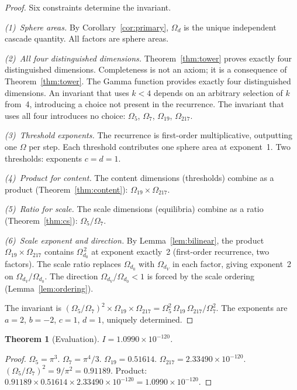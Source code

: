 \documentclass[11pt,a4paper]{article}
\newtheorem{theorem}{Theorem}[section]
\begin{document}
\begin{proof}
Six constraints determine the invariant.

\emph{(1)~Sphere areas.} By Corollary~\ref{cor:primary}, $\Omega_d$ is the
unique independent cascade quantity. All factors are sphere areas.

\emph{(2)~All four distinguished dimensions.}
Theorem~\ref{thm:tower} proves exactly four distinguished dimensions.
Completeness is not an axiom; it is a consequence of Theorem~\ref{thm:tower}.
The Gamma function provides exactly four distinguished dimensions. An
invariant that uses $k < 4$ depends on an arbitrary selection of $k$
from~4, introducing a choice not present in the recurrence. The invariant
that uses all four introduces no choice: $\Omega_5$, $\Omega_7$,
$\Omega_{19}$, $\Omega_{217}$.

\emph{(3)~Threshold exponents.} The recurrence is first-order
multiplicative, outputting one $\Omega$ per step. Each threshold
contributes one sphere area at exponent~1. Two thresholds: exponents
$c = d = 1$.

\emph{(4)~Product for content.} The content dimensions (thresholds) combine
as a product (Theorem~\ref{thm:content}):
$\Omega_{19}\times\Omega_{217}$.

\emph{(5)~Ratio for scale.} The scale dimensions (equilibria) combine as a
ratio (Theorem~\ref{thm:cs}): $\Omega_5/\Omega_7$.

\emph{(6)~Scale exponent and direction.} By Lemma~\ref{lem:bilinear}, the
product $\Omega_{19}\times\Omega_{217}$ contains $\Omega_{d_0}^{\,2}$ at
exponent exactly~2 (first-order recurrence, two factors). The scale
ratio replaces $\Omega_{d_0}$ with $\Omega_{d_V}$ in each factor,
giving exponent~2 on $\Omega_{d_V}/\Omega_{d_0}$. The direction
$\Omega_{d_V}/\Omega_{d_0} < 1$ is forced by the scale ordering
(Lemma~\ref{lem:ordering}).

The invariant is $(\Omega_5/\Omega_7)^2\times\Omega_{19}\times\Omega_{217}
= \Omega_5^2\,\Omega_{19}\,\Omega_{217}/\Omega_7^2$. The exponents are
$a = 2$, $b = -2$, $c = 1$, $d = 1$, uniquely determined.
\end{proof}

\begin{theorem}[Evaluation]
$I = 1.0990\times 10^{-120}$.
\end{theorem}

\begin{proof}
$\Omega_5 = \pi^3$.\;
$\Omega_7 = \pi^4/3$.\;
$\Omega_{19} = 0.51614$.\;
$\Omega_{217} = 2.33490\times 10^{-120}$.\;
$(\Omega_5/\Omega_7)^2 = 9/\pi^2 = 0.91189$.\;
Product: $0.91189\times 0.51614\times 2.33490\times 10^{-120}
= 1.0990\times 10^{-120}$.
\end{proof}
\end{document}

